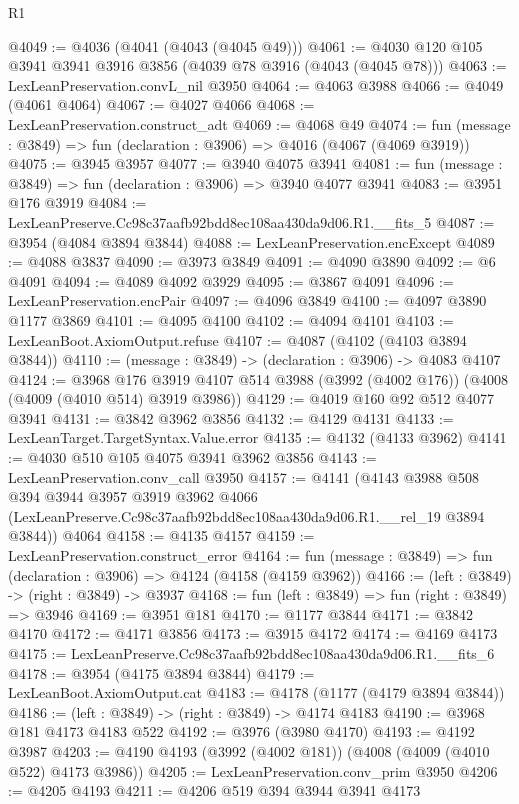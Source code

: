 \begin{lexlean}{R1}
\begin{coremodule}
@4049 := @4036 (@4041 (@4043 (@4045 @49)))
@4061 := @4030 @120 @105 @3941 @3941 @3916 @3856 (@4039 @78 @3916 (@4043 (@4045 @78)))
@4063 := LexLeanPreservation.convL_nil @3950
@4064 := @4063 @3988
@4066 := @4049 (@4061 @4064)
@4067 := @4027 @4066
@4068 := LexLeanPreservation.construct_adt
@4069 := @4068 @49
@4074 := fun (message : @3849) => fun (declaration : @3906) => @4016 (@4067 (@4069 @3919))
@4075 := @3945 @3957
@4077 := @3940 @4075 @3941
@4081 := fun (message : @3849) => fun (declaration : @3906) => @3940 @4077 @3941
@4083 := @3951 @176 @3919
@4084 := LexLeanPreserve.Cc98c37aafb92bdd8ec108aa430da9d06.R1.__fits_5
@4087 := @3954 (@4084 @3894 @3844)
@4088 := LexLeanPreservation.encExcept
@4089 := @4088 @3837
@4090 := @3973 @3849
@4091 := @4090 @3890
@4092 := @6 @4091
@4094 := @4089 @4092 @3929
@4095 := @3867 @4091
@4096 := LexLeanPreservation.encPair
@4097 := @4096 @3849
@4100 := @4097 @3890 @1177 @3869
@4101 := @4095 @4100
@4102 := @4094 @4101
@4103 := LexLeanBoot.AxiomOutput.refuse
@4107 := @4087 (@4102 (@4103 @3894 @3844))
@4110 := (message : @3849) -> (declaration : @3906) -> @4083 @4107
@4124 := @3968
    @176
    @3919
    @4107
    @514
    @3988
    (@3992 (@4002 @176))
    (@4008 (@4009 (@4010 @514) @3919 @3986))
@4129 := @4019 @160 @92 @512 @4077 @3941
@4131 := @3842 @3962 @3856
@4132 := @4129 @4131
@4133 := LexLeanTarget.TargetSyntax.Value.error
@4135 := @4132 (@4133 @3962)
@4141 := @4030 @510 @105 @4075 @3941 @3962 @3856
@4143 := LexLeanPreservation.conv_call @3950
@4157 := @4141
    (@4143
      @3988
      @508
      @394
      @3944
      @3957
      @3919
      @3962
      @4066
      (LexLeanPreserve.Cc98c37aafb92bdd8ec108aa430da9d06.R1.__rel_19 @3894 @3844))
    @4064
@4158 := @4135 @4157
@4159 := LexLeanPreservation.construct_error
@4164 := fun (message : @3849) => fun (declaration : @3906) => @4124 (@4158 (@4159 @3962))
@4166 := (left : @3849) -> (right : @3849) -> @3937
@4168 := fun (left : @3849) => fun (right : @3849) => @3946
@4169 := @3951 @181
@4170 := @1177 @3844
@4171 := @3842 @4170
@4172 := @4171 @3856
@4173 := @3915 @4172
@4174 := @4169 @4173
@4175 := LexLeanPreserve.Cc98c37aafb92bdd8ec108aa430da9d06.R1.__fits_6
@4178 := @3954 (@4175 @3894 @3844)
@4179 := LexLeanBoot.AxiomOutput.cat
@4183 := @4178 (@1177 (@4179 @3894 @3844))
@4186 := (left : @3849) -> (right : @3849) -> @4174 @4183
@4190 := @3968 @181 @4173 @4183 @522
@4192 := @3976 (@3980 @4170)
@4193 := @4192 @3987
@4203 := @4190 @4193 (@3992 (@4002 @181)) (@4008 (@4009 (@4010 @522) @4173 @3986))
@4205 := LexLeanPreservation.conv_prim @3950
@4206 := @4205 @4193
@4211 := @4206 @519 @394 @3944 @3941 @4173

\end{coremodule}
\end{lexlean}

